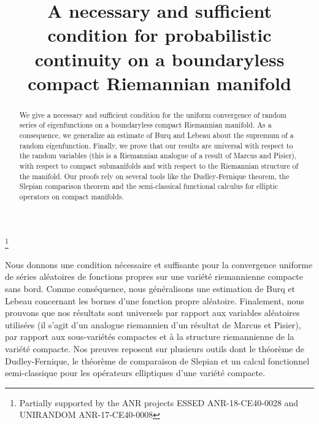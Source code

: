 \documentclass[JEP,XML,SOM,Unicode,NoEqCountersInSection,published]{cedram}
\theoremstyle{theorem}
\theoremstyle{definition}
\begin{document}
\title[Condition for probabilistic continuity on a compact manifold]{A necessary and sufficient condition for probabilistic continuity on a boundaryless compact Riemannian manifold}


\author[\initial{R.} \lastname{Imekraz}]{ }
\address{La Rochelle Université, MIA, EA 3165\\
F-17031 La Rochelle, France}

\thanks{ Partially supported by the ANR projects ESSED ANR-18-CE40-0028 and UNIRANDOM ANR-17-CE40-0008}




\begin{abstract}
We give a necessary and sufficient condition for the uniform convergence of random series of eigenfunctions on a boundaryless compact Riemannian manifold. As a consequence, we generalize an estimate of Burq and Lebeau about the supremum of a random eigenfunction. Finally, we prove that our results are universal with respect to the random variables (this is a Riemannian analogue of a result of Marcus and Pisier), with respect to compact submanifolds and with respect to the Riemannian structure of the manifold. Our proofs rely on several tools like the Dudley-Fernique theorem, the Slepian comparison theorem and the semi-classical functional calculus for elliptic operators on compact manifolds.
\end{abstract}

\begin{altabstract}
Nous donnons une condition nécessaire et suffisante pour la convergence uniforme de séries aléatoires de fonctions propres sur une variété riemannienne compacte sans bord. Comme conséquence, nous généralisons une estimation de Burq et Lebeau concernant les bornes d'une fonction propre aléatoire. Finalement, nous prouvons que nos résultats sont universels par rapport aux variables aléatoires utilisées (il s'agit d'un analogue riemannien d'un résultat de Marcus et Pisier), par rapport aux sous-variétés compactes et à la structure riemannienne de la variété compacte. Nos preuves reposent sur plusieurs outils dont le théorème de Dudley-Fernique, le théorème de comparaison de Slepian et un calcul fonctionnel semi-classique pour les opérateurs elliptiques d'une variété compacte.
\end{altabstract}
\end{document}
